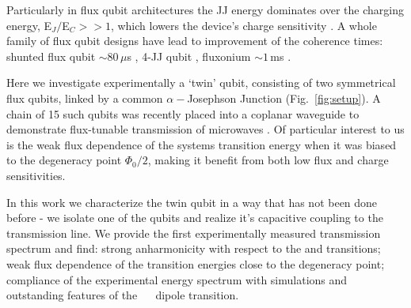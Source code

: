 Particularly in  flux qubit architectures  the JJ energy  dominates over the  charging energy,
E$_J/$E$_C     >>     1$,     which     lowers     the     device's     charge     sensitivity
\cite{orlando1999,chiorescu2003,mooij1999}.  A whole family of flux qubit designs have lead to
improvement of the  coherence times: shunted flux qubit $\sim80\,\mu$s  \cite{yan2016} , 4-JJ qubit
\cite{qui2016}, fluxonium $\sim1\,$ms \cite{pop2014}.

Here we investigate experimentally a `twin'  qubit, consisting of two symmetrical flux qubits,
linked by a common $ \alpha-$Josephson Junction  (Fig.~\ref{fig:setup}).  A chain of 15 such qubits
was recently  placed into  a coplanar  waveguide to  demonstrate flux-tunable  transmission of
microwaves \cite{shulga2018}.  Of particular interest to us is the weak flux dependence of the
systems transition  energy when  it was  biased to the  degeneracy point  $\Phi_0/2 $,  making it
benefit from both low flux and charge sensitivities.
 
In this  work we  characterize the twin  qubit in  a way that  has not been  done before  - we
isolate one of  the qubits and realize  it's capacitive coupling to the  transmission line. We
provide the first experimentally measured transmission spectrum and find: strong anharmonicity
with respect  to the  \ilra{} and  \ilra{} transitions;  weak flux
dependence  of the  transition  energies close  to  the degeneracy  point;  compliance of  the
experimental   energy   spectrum   with   simulations  and   outstanding   features   of   the
~\ilra~ dipole transition.


